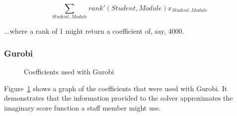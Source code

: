 $$\displaystyle\sum_{Student, Module} rank'(Student, Module)x_{Student, Module}$$

...where a rank of 1 might return a coefficient of, say, 4000.

\subsubsection{Gurobi}


\begin{figure}
  \begin{center}
  \end{center}
  \caption{Coefficients used with Gurobi}
  \label{gurobi_coeff}
\end{figure}

Figure~\ref{gurobi_coeff} shows a graph of the coefficients that were used
with Gurobi. It demonstrates that the information provided to the solver
approximates the imaginary score function a staff member might use.
